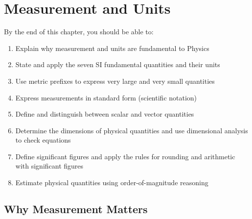 %

\chapter{Measurement and Units}
\label{ch:measurement}


\begin{objectivebox}
By the end of this chapter, you should be able to:
\begin{enumerate}[noitemsep]
  \item Explain why measurement and units are fundamental
  to Physics
  \item State and apply the seven SI fundamental quantities and
  their units
  \item Use metric prefixes to express very large and very
  small quantities
  \item Express measurements in standard form (scientific
  notation)
  \item Define and distinguish between scalar and vector
  quantities
  \item Determine the dimensions of physical quantities
  and use dimensional analysis to check equations
  \item Define significant figures and apply the rules for
  rounding and arithmetic with significant figures
  \item Estimate physical quantities using order-of-magnitude
  reasoning
\end{enumerate}
\end{objectivebox}

\vspace{0.4cm}

\minitoc

\vspace{0.5cm}

\section{Why Measurement Matters}
\label{sec:why_measurement}

